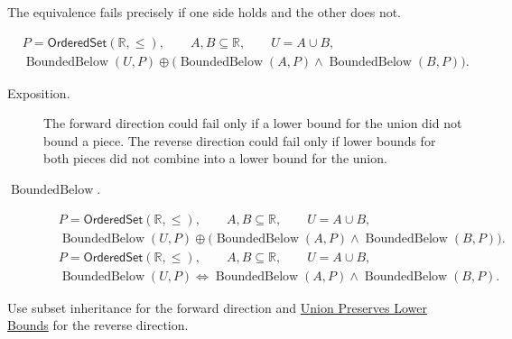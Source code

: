 \begin{remark*}
The equivalence fails precisely if one side holds and the other does not.
\end{remark*}

\begin{remark*}
\[
\begin{aligned}
&P=\mathsf{OrderedSet}(\mathbb{R},\leq),\qquad A,B\subseteq\mathbb{R},\qquad U=A\cup B,\\
&\operatorname{BoundedBelow}(U,P)\oplus
\bigl(\operatorname{BoundedBelow}(A,P)\land\operatorname{BoundedBelow}(B,P)\bigr).
\end{aligned}
\]
\end{remark*}

\begin{remark*}
\begin{description}
\item[Exposition.]
The forward direction could fail only if a lower bound for the union did not
bound a piece.  The reverse direction could fail only if lower bounds for both
pieces did not combine into a lower bound for the union.


  \item[\(\operatorname{BoundedBelow}.\)]

\[
\begin{aligned}
&P=\mathsf{OrderedSet}(\mathbb{R},\leq),\qquad A,B\subseteq\mathbb{R},\qquad U=A\cup B,\\
&\operatorname{BoundedBelow}(U,P)\oplus
\bigl(\operatorname{BoundedBelow}(A,P)\land\operatorname{BoundedBelow}(B,P)\bigr).
\end{aligned}
\]
\[
\begin{aligned}
&P=\mathsf{OrderedSet}(\mathbb{R},\leq),\qquad A,B\subseteq\mathbb{R},\qquad U=A\cup B,\\
&\operatorname{BoundedBelow}(U,P)
\Longleftrightarrow
\operatorname{BoundedBelow}(A,P)\land\operatorname{BoundedBelow}(B,P).
\end{aligned}
\]
\end{description}
\end{remark*}

\begin{remark*}[Interpretation]
Use subset inheritance for the forward direction and
\hyperref[lem:union-preserves-lower-bounds]{Union Preserves Lower Bounds} for
the reverse direction.
\end{remark*}

